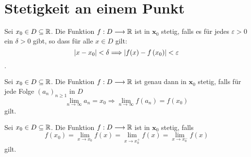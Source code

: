 \section{Stetigkeit an einem Punkt}

\Def[Epsilon] Sei $x_{0} \in D \subseteq \mathbb{R}$. Die Funktion $f: D \longrightarrow \mathbb{R}$ ist in $\boldsymbol{x}_{0}$ stetig, falls es für jedes $\varepsilon>0$ ein $\delta>0$ gibt, so dass für alle $x \in D$ gilt: $$\left\lvert x-x_{0} \right\rvert<\delta \Longrightarrow\left\lvert f(x)-f\left(x_{0}\right) \right\rvert<\varepsilon$$.

\Satz[Sequence] Sei $x_{0} \in D \subseteq \mathbb{R}$. Die Funktion $f: D \longrightarrow \mathbb{R}$ ist genau dann in $\boldsymbol{x}_{0}$ stetig, falls für jede Folge $\left(a_{n}\right)_{n \geqslant 1}$ in $D$
	$$\lim \limits_{n \rightarrow \infty} a_{n}=x_{0} \Longrightarrow \lim \limits_{n \rightarrow \infty} f\left(a_{n}\right)=f\left(x_{0}\right)$$ gilt.
	
\Satz[Sidewise] Sei $x_{0} \in D \subseteq \mathbb{R}$. Die Funktion $f: D \longrightarrow \mathbb{R}$ ist in $\boldsymbol{x}_{0}$ stetig, falls 
	$$f(x_0) =\lim \limits_{x \rightarrow x_0} f(x) =  \lim \limits_{x \rightarrow x_0^+} f(x) = \lim \limits_{x \rightarrow x_0^-} f(x)$$ gilt.	



